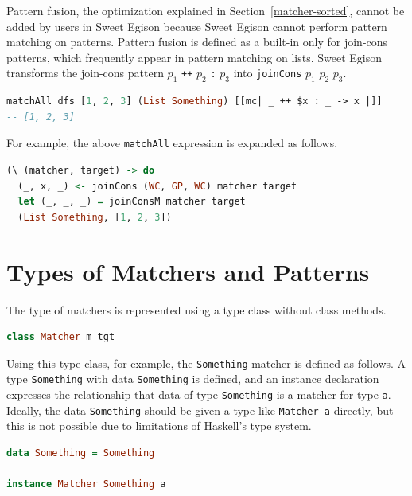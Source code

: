 Pattern fusion, the optimization explained in Section~\ref{matcher-sorted}, cannot be added by users in Sweet Egison because Sweet Egison cannot perform pattern matching on patterns.
Pattern fusion is defined as a built-in only for join-cons patterns, which frequently appear in pattern matching on lists.
Sweet Egison transforms the join-cons pattern $p_{1}$ \lstinline{++} $p_{2}$ \lstinline{:} $p_{3}$ into \lstinline{joinCons} $p_{1}$ $p_{2}$ $p_{3}$.
\begin{lstlisting}[language=haskell,numbers=none]
matchAll dfs [1, 2, 3] (List Something) [[mc| _ ++ $x : _ -> x |]]
-- [1, 2, 3]
\end{lstlisting}
For example, the above \lstinline{matchAll} expression is expanded as follows.
\begin{lstlisting}[language=haskell,numbers=none]
(\ (matcher, target) -> do
  (_, x, _) <- joinCons (WC, GP, WC) matcher target
  let (_, _, _) = joinConsM matcher target
  (List Something, [1, 2, 3])
\end{lstlisting}

\section{Types of Matchers and Patterns}\label{sweet-type}

The type of matchers is represented using a type class without class methods.
\begin{lstlisting}[language=haskell,numbers=none]
class Matcher m tgt
\end{lstlisting}
Using this type class, for example, the \lstinline{Something} matcher is defined as follows.
A type \lstinline{Something} with data \lstinline{Something} is defined, and an instance declaration expresses the relationship that data of type \lstinline{Something} is a matcher for type \lstinline{a}.
Ideally, the data \lstinline{Something} should be given a type like \lstinline{Matcher a} directly, but this is not possible due to limitations of Haskell's type system.
\begin{lstlisting}[language=haskell,numbers=none]
data Something = Something

instance Matcher Something a
\end{lstlisting}

